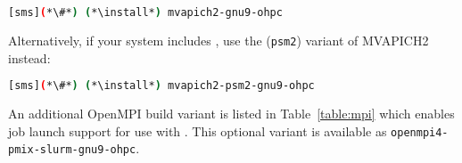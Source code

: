 \begin{lstlisting}[language=bash]
[sms](*\#*) (*\install*) mvapich2-gnu9-ohpc
\end{lstlisting}

Alternatively, if your system includes \IntelR{} \OmniPath{}, use the (\texttt{psm2})
variant of MVAPICH2 instead:

\begin{lstlisting}[language=bash]
[sms](*\#*) (*\install*) mvapich2-psm2-gnu9-ohpc
\end{lstlisting}

An additional OpenMPI build variant is listed in Table~\ref{table:mpi} which
enables \href{https://pmix.github.io/pmix/}{\color{blue}{PMIx}} job launch
support for use with \SLURM{}. This optional variant is
available as \texttt{openmpi4-pmix-slurm-gnu9-ohpc}.
